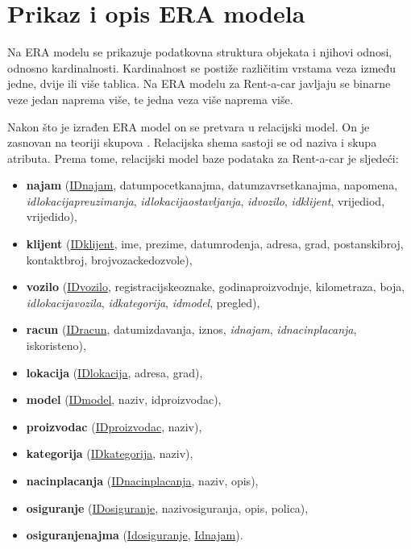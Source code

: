\documentclass[]{foi} %
\begin{document}
\section{Prikaz i opis ERA modela}

Na ERA modelu se prikazuje podatkovna struktura objekata i njihovi odnosi, odnosno kardinalnosti. Kardinalnost se postiže različitim vrstama veza između jedne, dvije ili više tablica. Na ERA modelu za Rent-a-car javljaju se binarne veze jedan naprema više, te jedna veza više naprema više.

Nakon što je izrađen ERA model on se pretvara u relacijski model. On je zasnovan na teoriji skupova \cite{tbp}. Relacijska shema sastoji se od naziva i skupa atributa. Prema tome, relacijski model baze podataka za Rent-a-car je sljedeći:

\begin{itemize}
  \item \textbf{najam} (\underline{IDnajam}, datumpocetkanajma, datumzavrsetkanajma, napomena, \textit{idlokacijapreuzimanja}, \textit{idlokacijaostavljanja}, \textit{idvozilo}, \textit{idklijent}, vrijediod, vrijedido),
  \item \textbf{klijent} (\underline{IDklijent}, ime, prezime, datumrodenja, adresa, grad, postanskibroj, kontaktbroj, brojvozackedozvole),
  \item \textbf{vozilo} (\underline{IDvozilo}, registracijskeoznake, godinaproizvodnje, kilometraza, boja, \textit{idlokacijavozila}, \textit{idkategorija}, \textit{idmodel}, pregled),
  \item \textbf{racun} (\underline{IDracun}, datumizdavanja, iznos, \textit{idnajam}, \textit{idnacinplacanja}, iskoristeno),
  \item \textbf{lokacija} (\underline{IDlokacija}, adresa, grad),
  \item \textbf{model} (\underline{IDmodel}, naziv, idproizvodac),
  \item \textbf{proizvodac} (\underline{IDproizvodac}, naziv),
  \item \textbf{kategorija} (\underline{IDkategorija}, naziv),
  \item \textbf{nacinplacanja} (\underline{IDnacinplacanja}, naziv, opis),
  \item \textbf{osiguranje} (\underline{IDosiguranje}, nazivosiguranja, opis, polica),
  \item \textbf{osiguranjenajma} (\underline{Idosiguranje}, \underline{Idnajam}).
\end{itemize}
\end{document}
